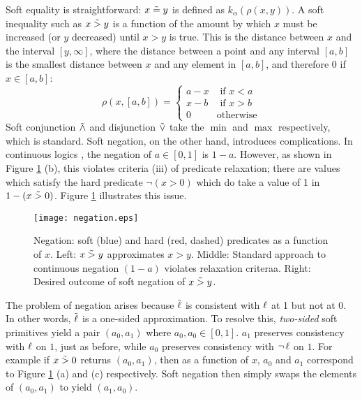 Soft equality is straightforward: $x \mathrel{\tilde{=}} y$ is defined as $k_\alpha(\rho(x, y))$.
A soft inequality such as $x \mathrel{\tilde{>}} y$ is a function of the amount by which $x$ must be increased (or $y$ decreased) until $x > y$ is true.
This is the distance between $x$ and the interval $[y, \infty]$, where the distance between a point and any interval $[a, b]$ is the smallest distance between $x$ and any element in $[a, b]$, and therefore 0 if $x \in [a, b]$:
\begin{equation}
\rho(x, [a, b]) =
\begin{cases}
  a - x & \text{ if } x < a\\
  x - b & \text{ if } x > b\\
  0              & \text{otherwise}
\end{cases}
\end{equation}
Soft conjunction $\mathrel{\tilde{\land}}$ and disjunction $\mathrel{\tilde{\lor}}$ take the $\min$ and $\max$ respectively, which is standard.
Soft negation, on the other hand, introduces complications.
In continuous logics \cite{kimmig2012short}, the negation of $a \in [0, 1]$ is $1 - a$.
However, as shown in Figure \ref{negationimg} (b), this violates criteria (iii) of predicate relaxation; there are values which satisfy the hard predicate $\neg(x > 0)$ which do take a value of 1 in $1 - (x \mathrel{\tilde{>}} 0)$.
Figure \ref{negationimg} illustrates this issue.


\begin{figure}
\texttt{[image: negation.eps]}
\caption{Negation: soft (blue) and hard (red, dashed) predicates as a function of $x$.  Left: $x \mathrel{\tilde{>}} y$ approximates $x > y$. Middle:  Standard approach to continuous negation $(1-a)$ violates relaxation criteraa. Right: Desired outcome of soft negation of $x \mathrel{\tilde{>}} y$.}\label{negationimg}
\end{figure}


The problem of negation arises because $\mathrel{\tilde{\operatorname{\ell}}}$ is consistent with $\operatorname{\ell}$ at 1 but not at 0.
In other words, $\mathrel{\tilde{\operatorname{\ell}}}$ is a one-sided approximation.
To resolve this, \emph{two-sided} soft primitives yield a pair $(a_0, a_1)$ where $a_0, a_0 \in [0, 1]$.
$a_1$ preserves consistency with $\operatorname{\ell}$ on $1$, just as before, while $a_0$ preserves consistency with $\neg \operatorname{\ell}$ on $1$.
For example if $x \mathrel{\tilde{>}} 0$ returns $(a_0, a_1)$, then as a function of $x$, $a_0$ and $a_1$ correspond to Figure \ref{negationimg} (a) and (c) respectively.
Soft negation then simply swaps the elements of $(a_0, a_1)$ to yield $(a_1, a_0)$.

